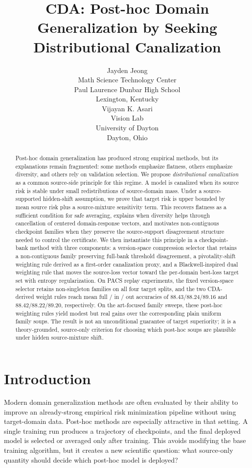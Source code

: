 \documentclass{article}
\title{CDA: Post-hoc Domain Generalization by Seeking Distributional Canalization}
\author{
Jayden Jeong\\
Math Science Technology Center\\
Paul Laurence Dunbar High School\\
Lexington, Kentucky\\
\And
Vijayan K. Asari\\
Vision Lab\\
University of Dayton\\
Dayton, Ohio
}
\theoremstyle{definition}
\begin{document}
\maketitle

\begin{abstract}
Post-hoc domain generalization has produced strong empirical methods, but its explanations remain fragmented: some methods emphasize flatness, others emphasize diversity, and others rely on validation selection. We propose \emph{distributional canalization} as a common source-side principle for this regime. A model is canalized when its source risk is stable under small redistributions of source-domain mass. Under a source-supported hidden-shift assumption, we prove that target risk is upper bounded by mean source risk plus a source-mixture sensitivity term. This recovers flatness as a sufficient condition for safe averaging, explains when diversity helps through cancellation of centered domain-response vectors, and motivates non-contiguous checkpoint families when they preserve the source-support disagreement structure needed to control the certificate. We then instantiate this principle in a checkpoint-bank method with three components: a version-space compression selector that retains a non-contiguous family preserving full-bank threshold disagreement, a pivotality-shift weighting rule derived as a first-order canalization proxy, and a Blackwell-inspired dual weighting rule that moves the source-loss vector toward the per-domain best-loss target set with entropy regularization. On PACS replay experiments, the fixed version-space selector retains non-singleton families on all four target splits, and the two CDA-derived weight rules reach mean full / in / out accuracies of \(88.43/88.24/89.16\) and \(88.42/88.22/89.20\), respectively. On the art-focused family sweeps, these post-hoc weighting rules yield modest but real gains over the corresponding plain uniform family soups. The result is not an unconditional guarantee of target superiority; it is a theory-grounded, source-only criterion for choosing which post-hoc soups are plausible under hidden source-mixture shift.
\end{abstract}

\section{Introduction}

Modern domain generalization methods are often evaluated by their ability to improve an already-strong empirical risk minimization pipeline without using target-domain data. Post-hoc methods are especially attractive in that setting. A single training run produces a trajectory of checkpoints, and the final deployed model is selected or averaged only after training. This avoids modifying the base training algorithm, but it creates a new scientific question: what source-only quantity should decide which post-hoc model is deployed?
\end{document}
